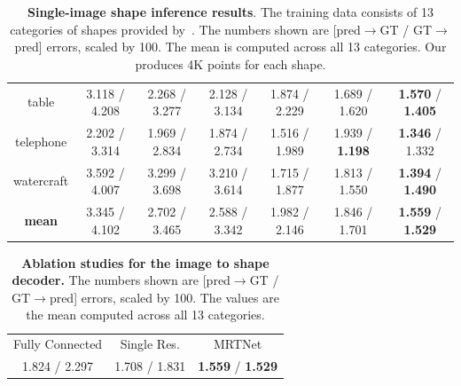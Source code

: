\begin{table}[t]
\begin{tabular}{c||c|c|c|c|c|c}
table & 3.118 / 4.208 & 2.268 / 3.277 & 2.128 / 3.134 & 1.874 / 2.229 & 1.689 / 1.620 & {\bf 1.570} / {\bf 1.405}\\
telephone & 2.202 / 3.314 & 1.969 / 2.834 & 1.874 / 2.734 & 1.516 / 1.989 & 1.939 / {\bf 1.198} & {\bf 1.346} / 1.332\\
watercraft & 3.592 / 4.007 & 3.299 / 3.698 & 3.210 / 3.614 & 1.715 / 1.877 & 1.813 / 1.550 & {\bf 1.394} / {\bf 1.490}\\
\hline
 \bf mean& 3.345 / 4.102 & 2.702 / 3.465 & 2.588 / 3.342 & 1.982 / 2.146 & 1.846 / 1.701 & {\bf 1.559} / {\bf 1.529}\\
\hline
\end{tabular}
\caption{\label{table:multi} \small \textbf{Single-image shape inference results}. The training data consists of 13 categories of shapes provided by~\cite{choy20163d}.     The numbers shown are [pred$\to$GT / GT$\to$pred] errors, scaled by 100. The mean is computed across all 13 categories. Our \mrtnet produces 4K points for each shape.
}
\vspace{-12pt}
\end{table}

\begin{table}[t]
\centering
\begin{tabular}{|c|c|c|}
\hline
Fully Connected & Single Res. & MRTNet \\
1.824 / 2.297 & 1.708 / 1.831 & {\bf 1.559} / {\bf 1.529} \\
\hline
\end{tabular}
\caption{\small
\label{table:ablation}
\textbf{Ablation studies for the image to shape decoder.} The numbers shown are [pred$\to$GT / GT$\to$pred] errors, scaled by 100. 
The values are the mean computed across all 13 categories.}
\vspace{-24pt}
\end{table}

